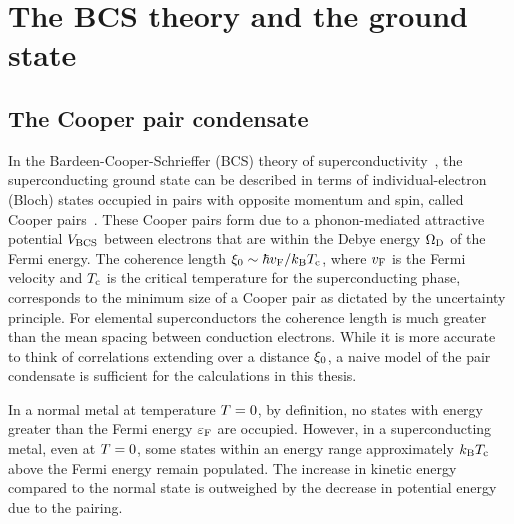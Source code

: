 \section{The BCS theory and the ground state }
\label{sec:theory.ground_state}

\subsection{The Cooper pair condensate}
\label{sec:theory.ground_state.condensate}

In the Bardeen-Cooper-Schrieffer (BCS) theory of superconductivity~\autocite{BCS1957PRL, BCS1957PR}, the superconducting ground state can be described in terms of individual-electron (Bloch) states occupied in pairs with opposite momentum and spin, called Cooper pairs~\autocite{Cooper1956PRL}.
These Cooper pairs form due to a phonon-mediated attractive potential $V_\mathrm{BCS}$ between electrons that are within the Debye energy $\Omega_{\mathrm{D}}$ of the Fermi energy.
The coherence length
$\xi_0 \sim \hbar v_{\mathrm{F}} / k_\mathrm{B} T_{\mathrm{c}}$,
where $v_{\mathrm{F}}$ is the Fermi velocity and $T_{\mathrm{c}}$ is the critical temperature for the superconducting phase, corresponds to the minimum size of a Cooper pair as dictated by the uncertainty principle.
For elemental superconductors the coherence length is much greater than the mean spacing between conduction electrons.
While it is more accurate to think of correlations extending over a distance $\xi_0$, a naive model of the pair condensate is sufficient for the calculations in this thesis.

In a normal metal at temperature $T = 0$, by definition, no states with energy greater than the Fermi energy $\varepsilon_{\mathrm{F}}$ are occupied.
However, in a superconducting metal, even at $T = 0$, some states within an energy range approximately $k_\mathrm{B} T_{\mathrm{c}}$ above the Fermi energy remain populated.
The increase in kinetic energy compared to the normal state is outweighed by the decrease in potential energy due to the pairing.

